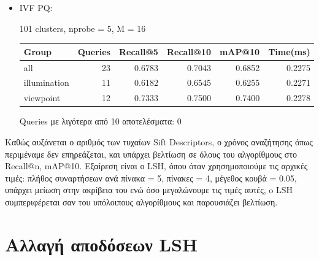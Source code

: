 \documentclass [conference]{IEEEtran}
\begin{document}
\begin{itemize}
    \item IVF PQ:
    \begin{table}[H]
    \centering
    \small
    \setlength{\tabcolsep}{3pt}
    101 clusters, nprobe = 5, M = 16
    \par\smallskip
    \begin{tabular}{l r r r r r}
    \hline
    \textbf{Group} & \textbf{Queries} & \textbf{Recall@5} & \textbf{Recall@10} & \textbf{mAP@10} & \textbf{Time(ms)} \\
    \hline
    all & 23 & 0.6783 & 0.7043 & 0.6852 & 0.2275 \\
    illumination & 11 & 0.6182 & 0.6545 & 0.6255 & 0.2271 \\
    viewpoint & 12 & 0.7333 & 0.7500 & 0.7400 & 0.2278 \\
    \hline
    \end{tabular}
    \par\smallskip
    \footnotesize Queries με λιγότερα από 10 αποτελέσματα: 0
    \end{table}

    
\end{itemize}

Καθώς αυξάνεται ο αριθμός των τυχαίων Sift Descriptors, ο χρόνος αναζήτησης όπως περιμέναμε δεν επηρεάζεται, και υπάρχει βελτίωση σε όλους του αλγορίθμους στο Recall@n, mAP@10. Εξαίρεση είναι ο LSH, όπου όταν χρησημοποιούμε τις αρχικές τιμές: πλήθος συναρτήσεων ανά πίνακα = 5, πίνακες = 4, μέγεθος κουβά = 0.05, υπάρχει μείωση στην ακρίβεια του ενώ όσο μεγαλώνουμε τις τιμές αυτές, o LSH συμπεριφέρεται σαν του υπόλοιπους αλγορίθμους και παρουσιάζει βελτίωση.

\section{Αλλαγή αποδόσεων LSH}
\end{document}
